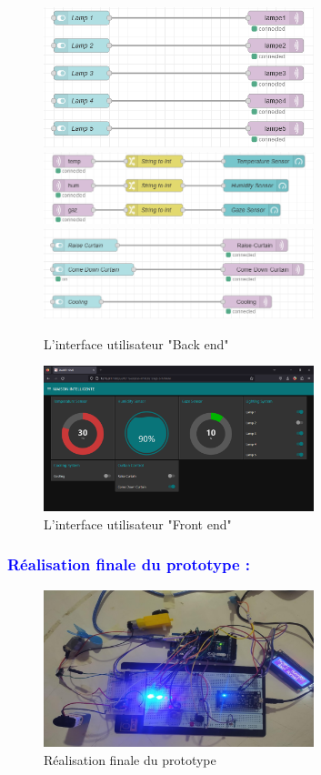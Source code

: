\begin{flushleft}
		\begin{figure}[h]
			\centering
			\includegraphics[width=0.7\textwidth]{chapitres/images/nodeRed2.png}
			\includegraphics[width=0.7\textwidth]{chapitres/images/nodeRed1.png}
			\includegraphics[width=0.7\textwidth]{chapitres/images/nodeRed3.png}
			\caption{L'interface utilisateur "Back end"}
			\label{fig:labelname}
		\end{figure}
		\begin{figure}[h]
			\centering
			\includegraphics[width=0.7\textwidth]{chapitres/images/nodeRed4.png}
			\caption{L'interface utilisateur "Front end"}
			\label{fig:labelname}
		\end{figure}
	 \newpage
	\subsubsection{\textcolor{blue}{Réalisation finale du prototype :} }
		
				\begin{figure}[h]
					\centering
					\includegraphics[width=0.7\textwidth]{chapitres/images/Picture2.jpg}
					\caption{Réalisation finale du prototype}
					\label{fig:labelname}
				\end{figure}
	\newpage
\end{flushleft}